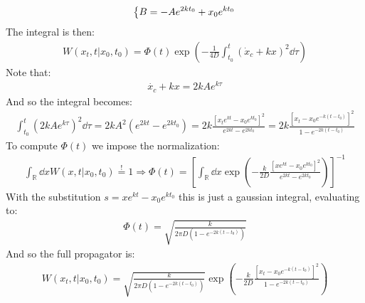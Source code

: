 \documentclass[../template.tex]{subfiles}
\begin{document}
\begin{exo}
\begin{align*}
\begin{dcases}
        B = -A e^{2k t_0} + x_0 e^{k t_0} 
    \end{dcases}
\end{align*}
The integral is then:
\begin{align*}
    W(x_t,t|x_0,t_0) = \Phi(t) \exp\left(-\frac{1}{4D} \int_{t_0}^t (\dot{x}_c + kx)^2 \dd{\tau} \right)
\end{align*}
Note that:
\begin{align*}
    \dot{x_c} + kx = 2k A e^{k \tau}
\end{align*}
And so the integral becomes:
\begin{align*}
    \int_{t_0}^t (2k A e^{k \tau})^2 \dd{\tau} = 2k  A^2 (e^{2kt} - e^{2kt_0}) = 2k \frac{[x_t e^{kt} - x_0 e^{k t_0}]^2}{e^{2kt} - e^{2k t_0}} = 2k \frac{[x_t - x_0 e^{-k(t-t_0)}]^2}{1 - e^{-2k(t-t_0)}} 
\end{align*}
To compute $\Phi(t)$ we impose the normalization:
\begin{align*}
    \int_{\mathbb{R}} \dd{x} W(x, t|x_0,t_0) \overset{!}{=} 1 \Rightarrow \Phi(t) = \left[\int_{\mathbb{R}} \dd{x} \exp\left(-\frac{k}{2D} \frac{[x e^{kt} - x_0 e^{k t_0}]^2}{e^{2kt} - e^{2k t_0}} \right)\right]^{-1}
\end{align*}
With the substitution $s = x e^{kt} - x_0 e^{k t_0}$ this is just a gaussian integral, evaluating to:
\begin{align*}
    \Phi(t) = \sqrt{\frac{k}{2 \pi D (1 - e^{-2k (t -t_0)})} }
\end{align*}
And so the full propagator is:
\begin{align}
    W(x_t, t|x_0, t_0) =  \sqrt{\frac{k}{2 \pi D (1 - e^{-2k (t -t_0)})} } \exp\left(-\frac{k}{2D} \frac{[x_t - x_0 e^{-k(t-t_0)}]^2}{1 - e^{-2k(t-t_0)}}\right)
    \label{eqn:harmonic-propagator-sol}
\end{align}

\end{exo}
\end{document}

